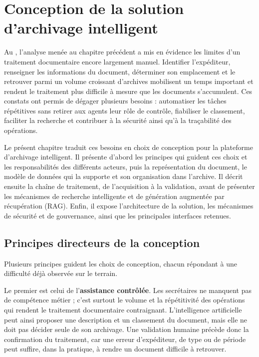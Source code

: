 \chapter[Conception de la solution]{Conception de la solution d'archivage intelligent}
\label{ch:conception}

Au \nomMinistere{}, l'analyse menée au chapitre précédent a mis en évidence les limites d'un traitement documentaire encore largement manuel. Identifier l'expéditeur, renseigner les informations du document, déterminer son emplacement et le retrouver parmi un volume croissant d'archives mobilisent un temps important et rendent le traitement plus difficile à mesure que les documents s'accumulent. Ces constats ont permis de dégager plusieurs besoins : automatiser les tâches répétitives sans retirer aux agents leur rôle de contrôle, fiabiliser le classement, faciliter la recherche et contribuer à la sécurité ainsi qu'à la traçabilité des opérations.

Le présent chapitre traduit ces besoins en choix de conception pour la plateforme d'archivage intelligent. Il présente d'abord les principes qui guident ces choix et les responsabilités des différents acteurs, puis la représentation du document, le modèle de données qui la supporte et son organisation dans l'archive. Il décrit ensuite la chaîne de traitement, de l'acquisition à la validation, avant de présenter les mécanismes de recherche intelligente et de génération augmentée par récupération (RAG). Enfin, il expose l'architecture de la solution, les mécanismes de sécurité et de gouvernance, ainsi que les principales interfaces retenues.

\section{Principes directeurs de la conception}

Plusieurs principes guident les choix de conception, chacun répondant à une difficulté déjà observée sur le terrain.

Le premier est celui de l'\textbf{assistance contrôlée}. Les secrétaires ne manquent pas de compétence métier ; c'est surtout le volume et la répétitivité des opérations qui rendent le traitement documentaire contraignant. L'intelligence artificielle peut ainsi proposer une description et un classement du document, mais elle ne doit pas décider seule de son archivage. Une validation humaine précède donc la confirmation du traitement, car une erreur d'expéditeur, de type ou de période peut suffire, dans la pratique, à rendre un document difficile à retrouver.

